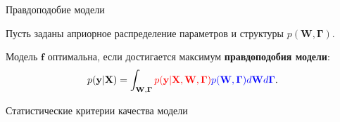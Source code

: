 \documentclass[usenames,dvipsnames,11pt,pdf,utf8,russian,aspectratio=169]{beamer}
\begin{document}
\begin{frame}{Правдоподобие модели}  
                                                                                          
Пусть заданы априорное распределение параметров и структуры $p(\mathbf{W}, \boldsymbol{\Gamma})$.

Модель $\mathbf{f}$  оптимальна, если достигается максимум \textbf{правдоподобия модели}:                                      
\[                                                                                                                                              
        p(\mathbf{y}|\mathbf{X}) = \int_{\mathbf{W}, \boldsymbol{\Gamma} } \textcolor{red}{p(\mathbf{y}|\mathbf{X},\mathbf{W},  \boldsymbol{\Gamma})} \textcolor{blue}{p(\mathbf{W}, \boldsymbol{\Gamma}) d\mathbf{W}d{\boldsymbol{\Gamma}}}.                         
\]       


\begin{figure}
  \centering

\end{figure}
\end{frame}


\begin{frame}{Статистические критерии качества модели}
\end{frame}
\end{document}
